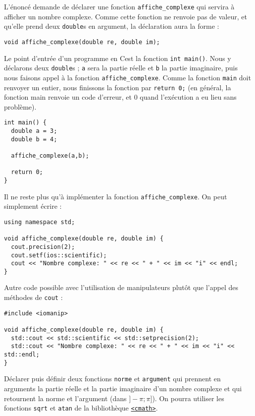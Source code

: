 \documentclass{book}
\newcommand{\inline}[1]{\texttt{#1}}
\newcommand{\cpp}{\mbox{C\vspace{.5em}\protect\raisebox{.2ex}{\footnotesize++~}}}
\begin{document}
\begin{correction}
L'énoncé demande de déclarer une fonction \inline{affiche_complexe} qui servira à afficher un nombre complexe. Comme cette fonction ne renvoie pas de valeur, et qu'elle prend deux \inline{double}s en argument, la déclaration aura la forme :
\begin{verbatim}
void affiche_complexe(double re, double im);
\end{verbatim}

Le point d'entrée d'un programme en \cpp est la fonction \inline{int main()}. Nous y déclarons deux \inline{double}s ; \inline{a} sera la partie réelle et \inline{b} la partie imaginaire, puis nous faisons appel à la fonction \inline{affiche_complexe}. Comme la fonction \inline{main} doit renvoyer un entier, nous finissons la fonction par \inline{return 0;} (en général, la fonction main renvoie un code d'erreur, et 0 quand l'exécution a eu lieu sans problème).

\begin{verbatim}
int main() {
  double a = 3;
  double b = 4;

  affiche_complexe(a,b);

  return 0;
}
\end{verbatim}

Il ne reste plus qu'à implémenter la fonction \inline{affiche_complexe}. On peut simplement écrire :
\begin{verbatim}
using namespace std;

void affiche_complexe(double re, double im) {
  cout.precision(2);
  cout.setf(ios::scientific);
  cout << "Nombre complexe: " << re << " + " << im << "i" << endl;
}
\end{verbatim}

Autre code possible avec l'utilisation de manipulateurs plutôt que l'appel des méthodes de \texttt{cout} :
\begin{verbatim}
#include <iomanip>

void affiche_complexe(double re, double im) {
  std::cout << std::scientific << std::setprecision(2);
  std::cout << "Nombre complexe: " << re << " + " << im << "i" << std::endl;
}
\end{verbatim}

\end{correction}

Déclarer puis définir deux fonctions \inline{norme} et \inline{argument} qui prennent en arguments la partie réelle et la partie imaginaire d'un nombre complexe et qui retournent la norme et l'argument (dans $]-\pi;\pi]$). On pourra utiliser les fonctions \texttt{sqrt} et \texttt{atan} de la bibliothèque \href{http://en.cppreference.com/w/cpp/header/cmath}{\inline{<cmath>}}.
\end{document}
